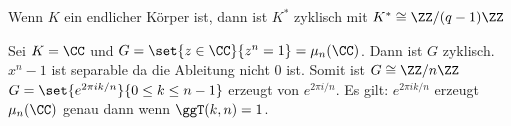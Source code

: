 \begin{Kor}
    Wenn \(K\) ein endlicher Körper ist, dann ist \(K^*\) zyklisch mit \(K^*\cong \ZZ/(q-1)\ZZ\)
\end{Kor}
\begin{Bsp}
    Sei \(K=\CC\) und \(G=\set{z\in\CC}{ z^n=1}=\mu_n(\CC)\). Dann ist \(G\) zyklisch. \(x^n-1\) ist separable da die Ableitung nicht \(0\) ist. Somit ist \(G\cong \ZZ/n\ZZ\) \(G=\set{e^{2\pi i k/n}}{ 0\leq k\leq n-1}\) erzeugt von \(e^{2\pi i/n}\). 
    Es gilt: \(e^{2\pi i k/n}\) erzeugt \(\mu_n(\CC)\) genau dann wenn \(\ggT(k,n)=1\).
\end{Bsp}